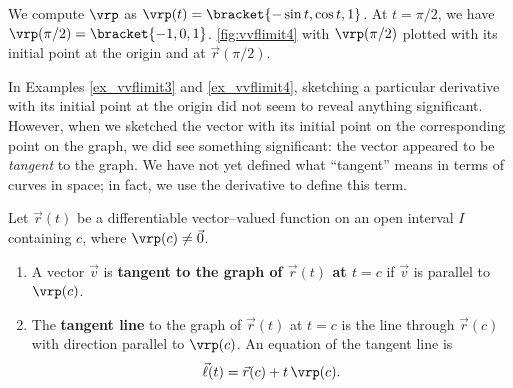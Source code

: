 {%
%
}%

{We compute $\vrp$ as $\vrp(t) =\bracket{-\sin t, \cos t, 1}$. At $t= \pi/2$, we have $\vrp(\pi/2) =\bracket{-1,0,1}$. \autoref{fig:vvflimit4}  with $\vrp(\pi/2)$ plotted with its initial point at the origin and at $\vec r(\pi/2)$.}

In Examples \ref{ex_vvflimit3} and \ref{ex_vvflimit4}, sketching a particular derivative with its initial point at the origin did not seem to reveal anything significant. However, when we sketched the vector with its initial point on the corresponding point on the graph, we did see something significant: the vector appeared to be \textit{tangent} to the graph. We have not yet defined what ``tangent'' means in terms of curves in space; in fact, we use the derivative to define this term.

{Let $\vec r(t)$ be a differentiable vector--valued function on an open interval $I$ containing $c$, where $\vrp(c)\neq \vec 0$.
\begin{enumerate}
	\item A vector $\vec v$ is \textbf{tangent to the graph of $\vec r(t)$ at $t=c$} if $\vec v$ is parallel to $\vrp(c)$.
	\item	The \textbf{tangent line}  to the graph of $\vec r(t)$ at $t=c$ is the line through $\vec r(c)$ with direction parallel to $\vrp(c)$. An equation of the tangent line is 
	$$\vec \ell(t) = \vec r(c) + t\,\vrp(c).$$
\end{enumerate}}

